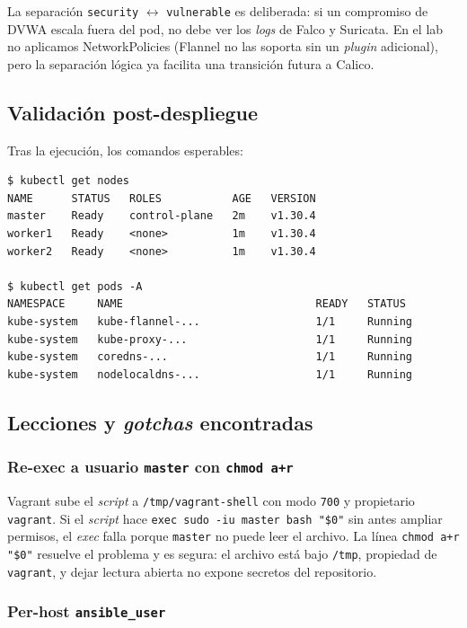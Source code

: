 La separación \texttt{security} $\leftrightarrow$ \texttt{vulnerable} es deliberada: si un compromiso de DVWA escala fuera del pod, no debe ver los \emph{logs} de Falco y Suricata. En el lab no aplicamos NetworkPolicies (Flannel no las soporta sin un \emph{plugin} adicional), pero la separación lógica ya facilita una transición futura a Calico.

\subsection{Validación post-despliegue}

Tras la ejecución, los comandos esperables:

\begin{lstlisting}[style=bash]
$ kubectl get nodes
NAME      STATUS   ROLES           AGE   VERSION
master    Ready    control-plane   2m    v1.30.4
worker1   Ready    <none>          1m    v1.30.4
worker2   Ready    <none>          1m    v1.30.4

$ kubectl get pods -A
NAMESPACE     NAME                              READY   STATUS
kube-system   kube-flannel-...                  1/1     Running
kube-system   kube-proxy-...                    1/1     Running
kube-system   coredns-...                       1/1     Running
kube-system   nodelocaldns-...                  1/1     Running
\end{lstlisting}

\subsection{Lecciones y \emph{gotchas} encontradas}

\subsubsection{Re-exec a usuario \texttt{master} con \texttt{chmod a+r}}

Vagrant sube el \emph{script} a \texttt{/tmp/vagrant-shell} con modo \texttt{700} y propietario \texttt{vagrant}. Si el \emph{script} hace \texttt{exec sudo -iu master bash "\$0"} sin antes ampliar permisos, el \emph{exec} falla porque \texttt{master} no puede leer el archivo. La línea \texttt{chmod a+r "\$0"} resuelve el problema y es segura: el archivo está bajo \texttt{/tmp}, propiedad de \texttt{vagrant}, y dejar lectura abierta no expone secretos del repositorio.

\subsubsection{Per-host \texttt{ansible\_user}}


